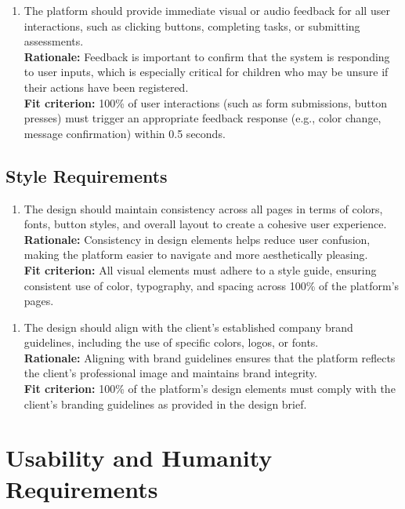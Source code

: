 \documentclass[12pt]{article}
\begin{document}
\begin{enumerate}[{LF-AR}5. ]
  \item The platform should provide immediate visual or audio feedback for all user interactions, such as clicking buttons, completing tasks, or submitting assessments.\\
  \textbf{Rationale: }Feedback is important to confirm that the system is responding to user inputs, which is especially critical for children who may be unsure if their actions have been registered.\\
  \textbf{Fit criterion: }100\% of user interactions (such as form submissions, button presses) must trigger an appropriate feedback response (e.g., color change, message confirmation) within 0.5 seconds.  
\end{enumerate}

\subsection{Style Requirements}
\begin{enumerate}[{LF-SR}1. ]
  \item The design should maintain consistency across all pages in terms of colors, fonts, button styles, and overall layout to create a cohesive user experience.\\
  \textbf{Rationale: }Consistency in design elements helps reduce user confusion, making the platform easier to navigate and more aesthetically pleasing.\\
  \textbf{Fit criterion: }All visual elements must adhere to a style guide, ensuring consistent use of color, typography, and spacing across 100\% of the platform’s pages.  
\end{enumerate}
\begin{enumerate}[{LF-SR}2. ]
  \item The design should align with the client's established company brand guidelines, including the use of specific colors, logos, or fonts.\\
  \textbf{Rationale: }Aligning with brand guidelines ensures that the platform reflects the client's professional image and maintains brand integrity.\\
  \textbf{Fit criterion: }100\% of the platform’s design elements must comply with the client’s branding guidelines as provided in the design brief.  
\end{enumerate}

\section{Usability and Humanity Requirements}
\end{document}
